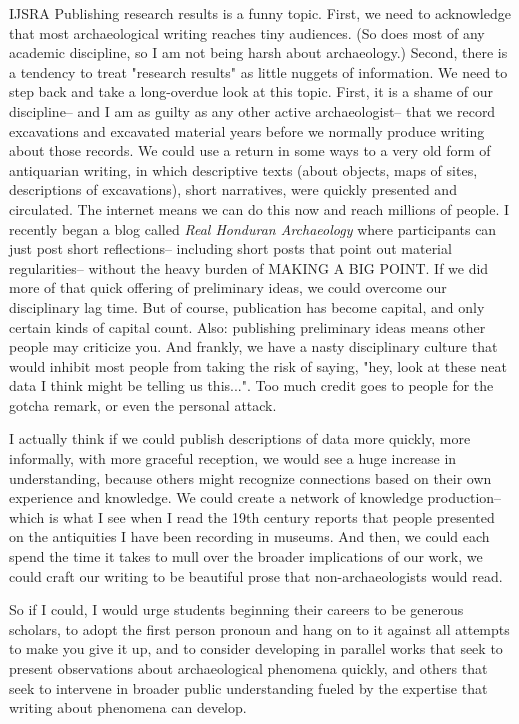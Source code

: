 \begin{labeling}{IJSRA}
Publishing research results is a funny topic. First, we need to acknowledge that most archaeological writing reaches tiny audiences. (So does most of any academic discipline, so I am not being harsh about archaeology.) Second, there is a tendency to treat "research results" as little nuggets of information. We need to step back and take a long-overdue look at this topic. First, it is a shame of our discipline-- and I am as guilty as any other active archaeologist-- that we record excavations and excavated material years before we normally produce writing about those records. We could use a return in some ways to a very old form of antiquarian writing, in which descriptive texts (about objects, maps of sites, descriptions of excavations), short narratives, were quickly presented and circulated. The internet means we can do this now and reach millions of people. I recently began a blog called \textit{Real Honduran Archaeology} where participants can just post short reflections-- including short posts that point out material regularities-- without the heavy burden of MAKING A BIG POINT. If we did more of that quick offering of preliminary ideas, we could overcome our disciplinary lag time. But of course, publication has become capital, and only certain kinds of capital count. Also: publishing preliminary ideas means other people may criticize you. And frankly, we have a nasty disciplinary culture that would inhibit most people from taking the risk of saying, "hey, look at these neat data I think might be telling us this...". Too much credit goes to people for the gotcha remark, or even the personal attack. 

I actually think if we could publish descriptions of data more quickly, more informally, with more graceful reception, we would see a huge increase in understanding, because others might recognize connections based on their own experience and knowledge. We could create a network of knowledge production-- which is what I see when I read the 19th century reports that people presented on the antiquities I have been recording in museums. And then, we could each spend the time it takes to mull over the broader implications of our work, we could craft our writing to be beautiful prose that non-archaeologists would read.

So if I could, I would urge students beginning their careers to be generous scholars, to adopt the first person pronoun and hang on to it against all attempts to make you give it up, and to consider developing in parallel works that seek to present observations about archaeological phenomena quickly, and others that seek to intervene in broader public understanding fueled by the expertise that writing about phenomena can develop.


\end{labeling}
